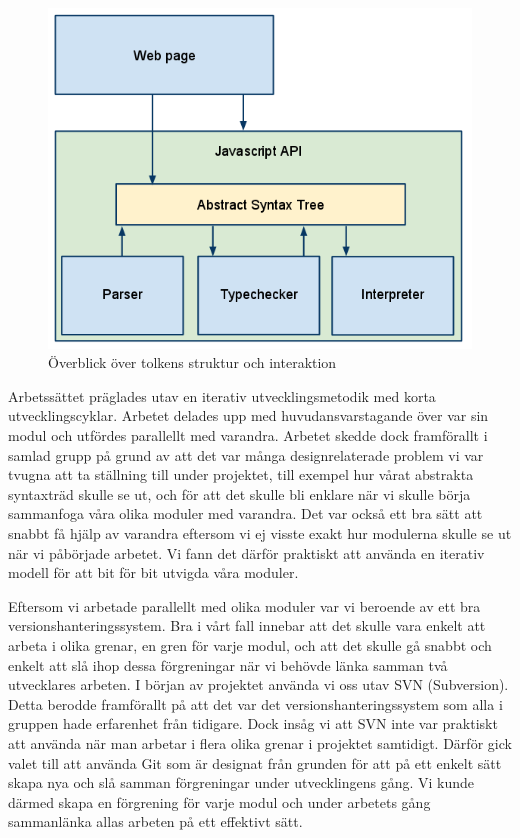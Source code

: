\begin{figure}[h]
    \begin{center}
        \includegraphics[width=1.0\textwidth]{image1.png}
        \caption{Överblick över tolkens struktur och interaktion}
        \label{fig:tolkens_struktur} %
    \end{center}
\end{figure}


Arbetssättet präglades utav en iterativ utvecklingsmetodik med korta utvecklingscyklar. Arbetet delades upp med huvudansvarstagande över var sin modul och utfördes parallellt med varandra. Arbetet skedde dock framförallt i samlad grupp på grund av att det var många designrelaterade problem vi var tvugna att ta ställning till under projektet, till exempel hur vårat abstrakta syntaxträd skulle se ut, och för att det skulle bli enklare när vi skulle börja sammanfoga våra olika moduler med varandra. 
Det var också ett bra sätt att snabbt få hjälp av varandra eftersom vi ej visste exakt hur modulerna skulle se ut när vi påbörjade arbetet. Vi fann det därför praktiskt att använda en iterativ modell för att bit för bit utvigda våra moduler. 

Eftersom vi arbetade parallellt med olika moduler var vi beroende av ett bra versionshanteringssystem. Bra i vårt fall innebar att det skulle vara enkelt att arbeta i olika grenar, en gren för varje modul, och att det skulle gå snabbt och enkelt att slå ihop dessa förgreningar när vi behövde länka samman två utvecklares arbeten. I början av projektet använda vi oss utav SVN (Subversion). Detta berodde framförallt på att det var det versionshanteringssystem som alla i gruppen hade erfarenhet från tidigare. Dock insåg vi att SVN inte var praktiskt att använda när man arbetar i flera olika grenar i projektet samtidigt. Därför gick valet till att använda Git som är designat från grunden för att på ett enkelt sätt skapa nya och slå samman förgreningar under utvecklingens gång. Vi kunde därmed skapa en förgrening för varje modul och under arbetets gång sammanlänka allas arbeten på ett effektivt sätt. 


